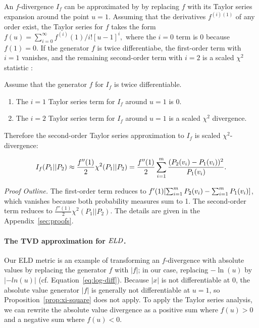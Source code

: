 {An $f$-divergence $I_{f}$ can be approximated by  by replacing $f$ with its Taylor series expansion around the point $u=1$. Assuming that the derivatives $f^{(i)(1)}$ of any order exist, the Taylor series for $f$ takes the form $f(u) = \sum_{i=0}^{\infty} f^{(i)}(1)/i! [u-1]^{i},$ where the $i=0$ term is 0 because $f(1) = 0$. If the generator $f$ is twice differentiabe, the first-order term with $i=1$ vanishes, and the remaining second-order term with $i=2$ is a scaled $\chi^{2}$ statistic \citep{Nielsen2014}:

\begin{proposition} \label{prop:xi-square}
Assume that the generator $f$ for $I_{f}$ is twice differentiable.   

\begin{enumerate}
\item The $i=1$ Taylor series term for  $I_{f}$ around $u=1$ is 0.
\item The $i=2$ Taylor series term for  $I_{f}$ around $u=1$ is a scaled $\chi^{2}$ divergence.
\end{enumerate}


Therefore the second-order Taylor series approximation to $I_{f}$ is scaled $\chi^{2}$-divergence:

$$I_{f}(P_{1}||P_{2}) \approx \frac{f''(1)}{2} \chi^{2}(P_{1}||P_{2}) = \frac{f''(1)}{2} 
\sum_{i=1}^{m}  \frac{(P_{2}(v_{i})-P_{1}(v_{i}))^{2}}
 {P_{1}(v_{i})}.$$ 
\end{proposition} 
{\em Proof Outline.} 
The first-order term reduces to $f'(1) [\sum_{i=1}^{m} P_{2}(v_{i}) - \sum_{i=1}^{m} P_{1}(v_{i})]$, which vanishes because both probability measures sum to 1. The second-order term reduces to $ \frac{f''(1)}{2} \chi^{2}(P_{1}||P_{2})$. The details are given in the Appendix~\ref{sec:proofs}. 

\paragraph{The TVD approximation for $\it{ELD}$.}

Our ELD metric is an example of transforming an $f$-divergence with absolute values by replacing the generator $f$ with $|f|$; in our case, replacing $-\ln(u)$ by $|-ln(u)|$ (cf. Equation~\eqref{eq:log-diff}). Because $|x|$ is not differentiable at 0,  the absolute value generator $|f|$ is generally not differentiable at $u=1$, so Proposition~\ref{prop:xi-square} does not apply. To apply the Taylor series analysis, we can rewrite the absolute value divergence as a positive sum where $f(u)>0$ and a negative sum where $f(u) < 0$. 

}
